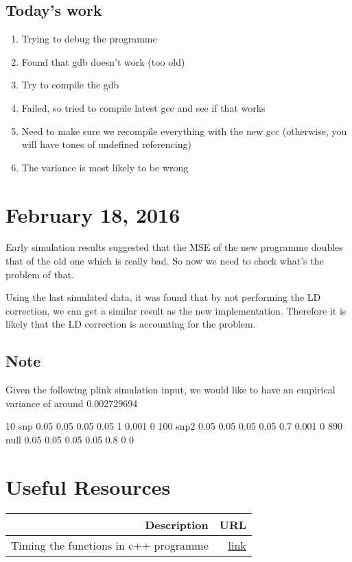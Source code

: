 \documentclass[12pt]{article}
\begin{document}
	\subsection{Today's work}
	\begin{enumerate}
		\item Trying to debug the programme
		\item Found that gdb doesn't work (too old)
		\item Try to compile the gdb
		\item Failed, so tried to compile latest gcc and see if that works
		\item Need to make sure we recompile everything with the new gcc (otherwise, you will have tones of undefined referencing)
		\item The variance is most likely to be wrong
	\end{enumerate}
	\section{February 18, 2016}
	Early simulation results suggested that the MSE of the new programme doubles that of the old one which is really bad. 
	So now we need to check what's the problem of that.
	
	Using the last simulated data, it was found that by not performing the LD correction, we can get a similar result as the new implementation. 
	Therefore it is likely that the LD correction is accounting for the problem.
	
	\subsection{Note}
	Given the following plink simulation input, we would like to have an empirical variance of around 0.002729694
	
	10 snp 0.05 0.05 0.05 0.05 1 0.001 0
	100 snp2 0.05 0.05 0.05 0.05 0.7 0.001 0
	890 null 0.05 0.05 0.05 0.05 0.8 0 0
	

	\newpage
	\section{Useful Resources}
	\begin{table}[H]
		\centering
		\begin{tabular}{rr}
			\toprule
			Description & URL \\
			\midrule
			Timing the functions in c++ programme & \href{http://stackoverflow.com/a/21995693}{link}\\
			\bottomrule
		\end{tabular}
	\end{table}
\end{document}
